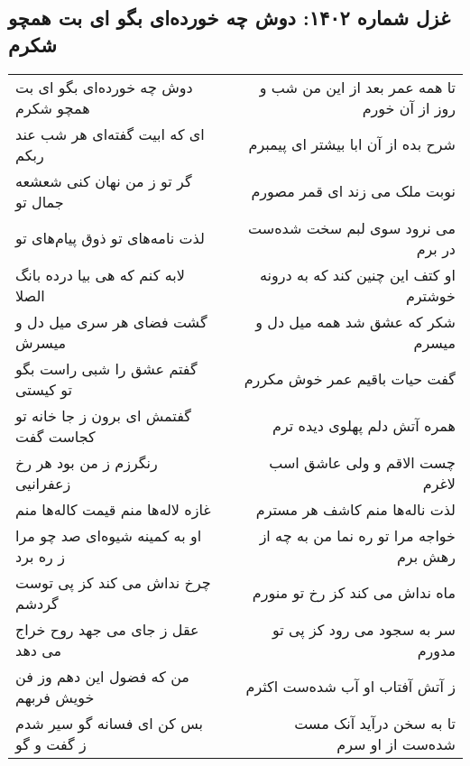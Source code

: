 \begin{center}
\section*{غزل شماره ۱۴۰۲: دوش چه خورده‌ای بگو ای بت همچو شکرم}
\label{sec:1402}
\begin{longtable}{l p{0.5cm} r}
دوش چه خورده‌ای بگو ای بت همچو شکرم
&&
تا همه عمر بعد از این من شب و روز از آن خورم
\\
ای که ابیت گفته‌ای هر شب عند ربکم
&&
شرح بده از آن ابا بیشتر ای پیمبرم
\\
گر تو ز من نهان کنی شعشعه جمال تو
&&
نوبت ملک می زند ای قمر مصورم
\\
لذت نامه‌های تو ذوق پیام‌های تو
&&
می نرود سوی لبم سخت شده‌ست در برم
\\
لابه کنم که هی بیا درده بانگ الصلا
&&
او کتف این چنین کند که به درونه خوشترم
\\
گشت فضای هر سری میل دل و میسرش
&&
شکر که عشق شد همه میل دل و میسرم
\\
گفتم عشق را شبی راست بگو تو کیستی
&&
گفت حیات باقیم عمر خوش مکررم
\\
گفتمش ای برون ز جا خانه تو کجاست گفت
&&
همره آتش دلم پهلوی دیده ترم
\\
رنگرزم ز من بود هر رخ زعفرانیی
&&
چست الاقم و ولی عاشق اسب لاغرم
\\
غازه لاله‌ها منم قیمت کاله‌ها منم
&&
لذت ناله‌ها منم کاشف هر مسترم
\\
او به کمینه شیوه‌ای صد چو مرا ز ره برد
&&
خواجه مرا تو ره نما من به چه از رهش برم
\\
چرخ نداش می کند کز پی توست گردشم
&&
ماه نداش می کند کز رخ تو منورم
\\
عقل ز جای می جهد روح خراج می دهد
&&
سر به سجود می رود کز پی تو مدورم
\\
من که فضول این دهم وز فن خویش فربهم
&&
ز آتش آفتاب او آب شده‌ست اکثرم
\\
بس کن ای فسانه گو سیر شدم ز گفت و گو
&&
تا به سخن درآید آنک مست شده‌ست از او سرم
\\
\end{longtable}
\end{center}
